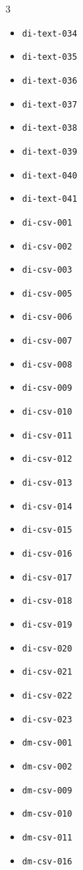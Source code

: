 \begin{multicols}{3}
\begin{itemize}[nosep, leftmargin=*]
        \item \texttt{di-text-034}
        \item \texttt{di-text-035}
        \item \texttt{di-text-036}
        \item \texttt{di-text-037}
        \item \texttt{di-text-038}
        \item \texttt{di-text-039}
        \item \texttt{di-text-040}
        \item \texttt{di-text-041}
        \item \texttt{di-csv-001}
        \item \texttt{di-csv-002}
        \item \texttt{di-csv-003}
        \item \texttt{di-csv-005}
        \item \texttt{di-csv-006}
        \item \texttt{di-csv-007}
        \item \texttt{di-csv-008}
        \item \texttt{di-csv-009}
        \item \texttt{di-csv-010}
        \item \texttt{di-csv-011}
        \item \texttt{di-csv-012}
        \item \texttt{di-csv-013}
        \item \texttt{di-csv-014}
        \item \texttt{di-csv-015}
        \item \texttt{di-csv-016}
        \item \texttt{di-csv-017}
        \item \texttt{di-csv-018}
        \item \texttt{di-csv-019}
        \item \texttt{di-csv-020}
        \item \texttt{di-csv-021}
        \item \texttt{di-csv-022}
        \item \texttt{di-csv-023}
        \item \texttt{dm-csv-001}
        \item \texttt{dm-csv-002}
        \item \texttt{dm-csv-009}
        \item \texttt{dm-csv-010}
        \item \texttt{dm-csv-011}
        \item \texttt{dm-csv-016}

\end{itemize}
\end{multicols}
